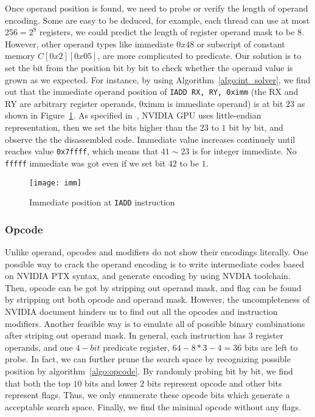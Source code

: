 Once operand position is found, we need to probe or verify the length of operand encoding. Some are easy to be
deduced, for example, each thread can use at most $256=2^{8}$ registers, we could predict the length of register 
operand mask to be $8$.
However, other operand types like immediate $0x48$ or subscript of constant memory $C[0x2][0x05]$, are more complicated 
to predicate. Our solution is to set the bit from the position bit by bit to check whether the operand value is grown 
as we expected. For instance, by using Algorithm~\ref{algo:int_solver}, we find out that the immediate operand position 
of {\tt IADD RX, RY, 0ximm} (the RX and RY are arbitrary register operands, 0ximm is immediate operand) is at bit $23$ 
as shown in Figure~\ref{fig:imm}. As specified in~\cite{cuda2015programming}, NVIDIA GPU uses little-endian 
representation, then we set the bits higher than the $23$ to $1$ bit by bit, and observe the the disassembled code. 
Immediate value increases continuely until reaches value {\tt 0x7ffff}, which means that $41\sim23$ is for integer 
immediate. No {\tt fffff} immediate was got even if we set bit $42$ to be $1$.  

\begin{figure}[htbp]
\begin{center}
\texttt{[image: imm]}
    \caption{Immediate position at {\tt IADD} instruction}
\label{fig:imm}
\end{center}
\end{figure}

\subsubsection{Opcode}
Unlike operand, opcodes and modifiers do not show their encodings literally. One possible way to crack the operand 
encoding is to write intermediate codes
based on NVIDIA PTX syntax, and generate encoding by using NVDIA toolchain.
Then, opcode can be got by stripping out operand mask, and flag can be found by stripping out both opcode and operand 
mask. However, the uncompleteness of NVIDIA document hinders us to find out all the opcodes and instruction modifiers. 
Another feasible way is to emulate all of possible binary combinations after striping out operand mask.
In general, each instruction has $3$ register operands, and one $4-bit$ predicate register, $64-8*3-4=36$ bits are left 
to probe.
In fact, we can further prune the search space by recognizing possible position by algorithm~\ref{algo:opcode}. By 
randomly probing bit by bit, we find that both the top $10$ bits and lower $2$ bits represent opcode and other bits 
represent flags. Thus, we only enumerate these opcode bits which generate a acceptable search space. Finally, we find 
the minimal opcode without any flags. 


